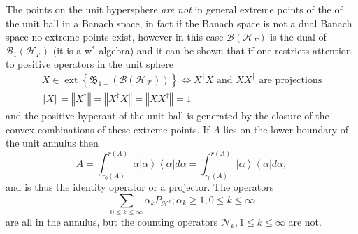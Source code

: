 \documentclass[aps,preprint]{revtex4}%
\begin{document}
The points on the unit hypersphere \emph{are not }in general extreme points of
the of the unit ball in a Banach space, in fact if the Banach space is not a
dual Banach space no extreme points exist, however in this case $\mathcal{B}%
\left(  \mathcal{H}_{F}\right)  $ is the dual of $\mathcal{B}_{1}\left(
\mathcal{H}_{F}\right)  $ (it is a w$^{\ast}$-algebra) and it can be shown
that if one restricts attention to positive operators in the unit sphere
\begin{gather}
X\in\operatorname*{ext}\left\{  \mathfrak{B}_{1+}\left(  \mathcal{B}\left(
\mathcal{H}_{\mathcal{F}}\right)  \right)  \right\}  \Leftrightarrow
X^{\dagger}X\text{ and }XX^{\dagger}\text{ are projections}\\
\left\Vert X\right\Vert =\left\Vert X^{\dagger}\right\Vert =\left\Vert
X^{\dagger}X\right\Vert =\left\Vert XX^{\dagger}\right\Vert =1
\end{gather}
and the positive hyperant of the unit ball is generated by the closure of the
convex combinations of these extreme points. If $A$ lies on the lower boundary
of the unit annulus then
\begin{equation}
A=\int_{r_{0}\left(  A\right)  }^{r\left(  A\right)  }\alpha\left\vert
\alpha\right\rangle \left\langle \alpha\right\vert d\alpha=\int_{r_{0}\left(
A\right)  }^{r\left(  A\right)  }\left\vert \alpha\right\rangle \left\langle
\alpha\right\vert d\alpha,
\end{equation}
and is thus the identity operator or a projector. The operators
\begin{equation}
\sum_{0\leq k\leq\infty}\alpha_{k}P_{\mathcal{H}^{k}};\alpha_{k}\geq1,0\leq
k\leq\infty
\end{equation}
are all in the annulus, but the counting operators $\mathcal{N}_{k},1\leq
k\leq\infty$ are not.
\end{document}
